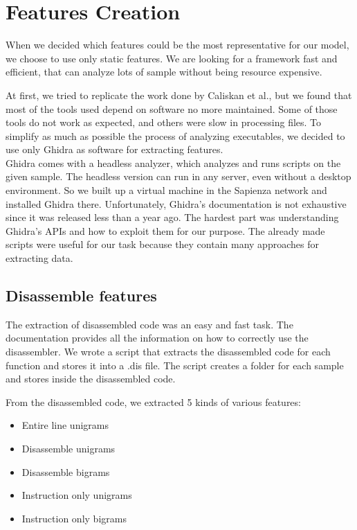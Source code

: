 \chapter{Features Creation}

When we decided which features could be the most representative for our model, we choose to use only static features. We are looking for a framework fast and efficient, that can analyze lots of sample without being resource expensive.

At first, we tried to replicate the work done by Caliskan et al., but we found that most of the tools used depend on software no more maintained. Some of those tools do not work as expected, and others were slow in processing files. To simplify as much as possible the process of analyzing executables, we decided to use only Ghidra as software for extracting features.\\


Ghidra comes with a headless analyzer, which analyzes and runs scripts on the given sample. The headless version can run in any server, even without a desktop environment. So we built up a virtual machine in the Sapienza network and installed Ghidra there.  Unfortunately, Ghidra's documentation is not exhaustive since it was released less than a year ago. The hardest part was understanding Ghidra's APIs and how to exploit them for our purpose. The already made scripts were useful for our task because they contain many approaches for extracting data. \\


\section{Disassemble features}

The extraction of disassembled code was an easy and fast task. The documentation provides all the information on how to correctly use the disassembler. We wrote a script that extracts the disassembled code for each function and stores it into a .dis file. The script creates a folder for each sample and stores inside the disassembled code.

From the disassembled code, we extracted 5 kinds of various features:
\begin{itemize}
	\item{Entire line unigrams}
	\item{Disassemble unigrams}
	\item{Disassemble bigrams}
	\item{Instruction only unigrams}
	\item{Instruction only bigrams}
\end{itemize}

